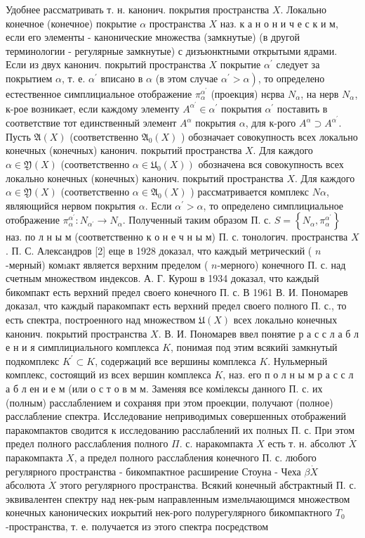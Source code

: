\documentclass[10pt]{article}
\begin{document}
Удобнее рассматривать т. н. канонич. покрытия пространства $X$. Локально конечное (конечное) покрытие $\alpha$ пространства $X$ наз. к а н о н и ч е с к и м, если его элементы - канонические множества (замкнутые) (в другой терминологии - регулярные замкнутые) с дизъюнктными открытыми ядрами. Если из двух канонич. покрытий пространства $X$ покрытие $\alpha^{\prime}$ следует за покрытием $\alpha$, т. е. $\alpha^{\prime}$ вписано в $\alpha$ (в этом случае $\left.\alpha^{\prime}>\alpha\right)$, то определено естественное симплициальное отображение $\pi_{\alpha}^{\alpha^{\prime}}$ (проекция) нєрва $N_{\alpha}$, на нерв $N_{\alpha}$, к-рое возникает, если каждому элементу $A^{\alpha^{\prime}} \in \alpha^{\prime}$ покрытия $\alpha^{\prime}$ поставить в соответствие тот единственный элемент $A^{\alpha}$ покрытия $\alpha$, для к-рого $A^{\alpha} \supset A^{\alpha^{\prime}}$. Пусть $\mathfrak{A}(X)$ (соответственно $\mathfrak{A}_{0}(X)$ ) обозначает совокупность всех локально конечных (конечных) канонич. покрытий пространства $X$. Для каждого $\alpha \in \mathfrak{Y}(X)$ (соответственно $\left.\alpha \in \mathfrak{U}_{0}(X)\right)$ обозначена вся совокупность всех локально конечных (конечных) канонич. покрытий пространства $X$. Для каждого $\alpha \in \mathfrak{Y}(X)$ (соответственно $\alpha \in \mathfrak{A}_{0}(X)$ ) рассматривается комплекс $N \alpha$, являющийся нервом покрытия $\alpha$. Если $\alpha^{\prime}>\alpha$, то определено симплициальное отображение $\pi_{\alpha}^{\alpha^{\prime}}: N_{\alpha^{\prime}} \rightarrow N_{\alpha}$. Полученный таким образом П. с. $S=\left\{N_{\alpha}, \pi_{\alpha}^{\alpha^{\prime}}\right\}$ наз. по л н ы м (соответственно к о н е ч н ы м) П. с. тонологич. пространства $X$. П. С. Александров [2] еще в 1928 доказал, что каждый метрический ( $n$-мерный) комıакт является верхним пределом ( $n$-мерного) конечного П. с. над счетным множеством индексов. А. Г. Курош в 1934 доказал, что каждый бикомпакт есть верхний предел своего конечного П. с. В 1961 В. И. Пономарев доказал, что каждый паракомпакт есть верхний предел своего полного П. с., то есть спектра, построенного над множеством $\mathfrak{U}(X)$ всех локально конечных канонич. покрытий пространства $X$. В. И. Пономарев ввел понятие р а с с л а б л е н и я симплициального комплекса $K$, понимая под этим всякийі замкнутый подкомплекс $K^{\prime} \subset K$, содержаций все вершины комплекса $K$. Нульмерный комплекс, состоящий из всех вершин комплекса $K$, наз. его п о л н ы м р а с с л а б л ен и е м (или о с т о в м м. Заменяя все комілексы данного П. с. их (полным) расслаблением и сохраняя при этом проекции, получают (полное) расслабление спектра. Исследование неприводимых совершенных отображений паракомпактов сводится к исследованию расслаблений их полных П. с. При этом предел полного расслабления полного $\Pi$. с. наракомпакта $X$ есть т. н. абсолют $\dot{X}$ паракомпакта $X$, а предел полного расслабления конечного П. с. любого регулярного пространства - бикомпактное расширение Стоуна - Чеха $\beta \dot{X}$ абсолюта $\dot{X}$ этого регулярного пространства. Всякий конечный абстрактный П. с. эквивалентен спектру над нек-рым направленным измельчающимся множеством конечных канонических иокрытий нек-рого полурегулярного бикомпактного $T_{0}$-пространства, т. е. получается из этого спектра посредством 
\end{document}
